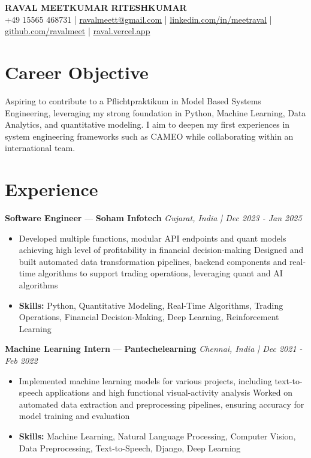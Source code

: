 \documentclass[a4paper,10pt]{article}
\begin{document}
\begin{center}
  {\Large\bfseries RAVAL MEETKUMAR RITESHKUMAR}\\[2pt]
  {\small +49 15565 468731 \;|\; \href{mailto:ravalmeett@gmail.com}{ravalmeett@gmail.com} \;|\; \href{https://www.linkedin.com/in/meetraval/}{linkedin.com/in/meetraval} \;|\; \href{https://github.com/ravalmeet}{github.com/ravalmeet} \;|\; \href{https://raval.vercel.app/}{raval.vercel.app}}
\end{center}
\vspace{-3pt}

\section*{Career Objective}
Aspiring to contribute to a Pflichtpraktikum in Model Based Systems Engineering, leveraging my strong foundation in Python, Machine Learning, Data Analytics, and quantitative modeling. I aim to deepen my first experiences in system engineering frameworks such as CAMEO while collaborating within an international team.\par

\section*{Experience}
\textbf{Software Engineer} — \textbf{Soham Infotech} \hfill \textit{Gujarat, India \;|\; Dec 2023 - Jan 2025}\par
\vspace{1pt}
\begin{itemize}
  \item Developed multiple functions, modular API endpoints and quant models achieving high level of profitability in financial decision-making Designed and built automated data transformation pipelines, backend components and real-time algorithms to support trading operations, leveraging quant and AI algorithms
  \item \textbf{Skills:} Python, Quantitative Modeling, Real-Time Algorithms, Trading Operations, Financial Decision-Making, Deep Learning, Reinforcement Learning
\end{itemize}
\vspace{3pt}
\textbf{Machine Learning Intern} — \textbf{Pantechelearning} \hfill \textit{Chennai, India \;|\; Dec 2021 - Feb 2022}\par
\vspace{1pt}
\begin{itemize}
  \item Implemented machine learning models for various projects, including text-to-speech applications and high functional visual-activity analysis Worked on automated data extraction and preprocessing pipelines, ensuring accuracy for model training and evaluation
  \item \textbf{Skills:} Machine Learning, Natural Language Processing, Computer Vision, Data Preprocessing, Text-to-Speech, Django, Deep Learning
\end{itemize}
\end{document}
